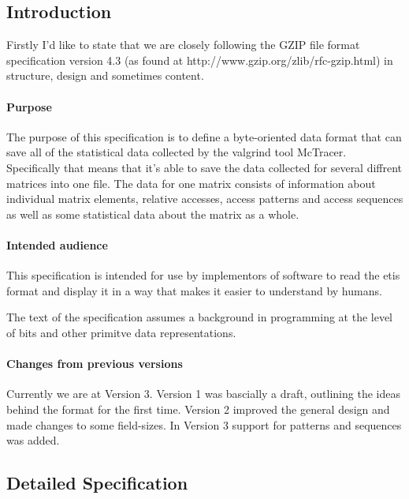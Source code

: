 \subsection{Introduction}

Firstly I'd like to state that we are closely following the GZIP file format specification version 4.3 (as found at http://www.gzip.org/zlib/rfc-gzip.html) in structure, design and sometimes content.

\paragraph{Purpose}

The purpose of this specification is to define a byte-oriented data format that can save all of the statistical data collected by the valgrind tool McTracer. Specifically that means that it's able to save
the data collected for several diffrent matrices into one file. The data for one matrix consists of information about individual matrix elements, relative accesses, access patterns and access sequences as
well as some statistical data about the matrix as a whole.

\paragraph{Intended audience}

This specification is intended for use by implementors of software to read the etis format and display it in a way that makes it easier to understand by humans.

The text of the specification assumes a background in programming at the level of bits and other primitve data representations.

\paragraph{Changes from previous versions}
Currently we are at Version 3. Version 1 was bascially a draft, outlining the ideas behind the format for the first time. Version 2 improved the general design and made changes to some field-sizes. 
In Version 3 support for patterns and sequences was added.

\subsection{Detailed Specification} 

